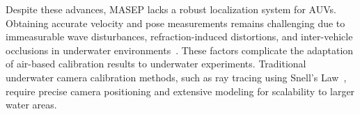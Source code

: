 \documentclass[11pt]{article}
\begin{document}
        Despite these advances, MASEP lacks a robust localization system for AUVs. Obtaining accurate velocity and pose measurements remains challenging due to immeasurable wave disturbances, refraction-induced distortions, and inter-vehicle occlusions in underwater environments~\cite{pedersen_camera_2018, cai_data-driven_2025}. These factors complicate the adaptation of air-based calibration results to underwater experiments. Traditional underwater camera calibration methods, such as ray tracing using Snell's Law~\cite{pedersen_camera_2018}, require precise camera positioning and extensive modeling for scalability to larger water areas.
        



        
\end{document}
